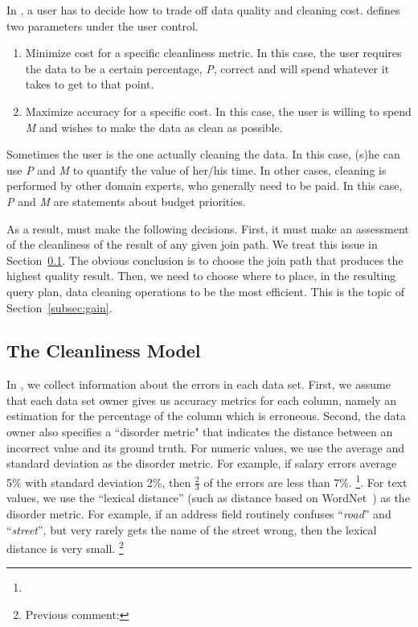 In \dcv, a user has to decide how to trade off data quality and cleaning cost. 
\dcv defines two parameters under the user control.

\begin{enumerate}
\item Minimize cost for a specific cleanliness metric. In this case, the user requires the data to be a certain percentage, \emph{P}, correct and will spend whatever it takes to get to that point.

\item Maximize accuracy for a specific cost. In this case, the user is willing to spend \emph{M} and wishes to make the data as clean as possible.
\end{enumerate}


Sometimes the user is the one actually cleaning the data. In this case, (s)he can use \emph{P} and \emph{M} to quantify the value of her/his time. 
In other cases, cleaning is performed by other domain experts, who generally need to be paid. In this case, \emph{P} and \emph{M} are statements about budget priorities.



As a result, \dcv must make the following decisions.  First, it must make an assessment of the cleanliness of the result of any given join path.  We treat this issue in Section~\ref{subsec:model}. The obvious conclusion is to choose the join path that produces the highest quality result.
Then, we need to choose where to place,  in the resulting query plan, data cleaning operations to be the most efficient.  This is the topic of Section~\ref{subsec:gain}.


\subsection{The Cleanliness Model}
\label{subsec:model}

In \dcv, we collect information about the errors in each data set. First, we assume that each data set owner gives us accuracy metrics for each column, namely an estimation for the percentage of the column which is erroneous. Second, the data owner also specifies a ``disorder metric" that indicates the distance between an incorrect value and its ground truth. For numeric values, we use the average and standard deviation as the disorder metric. For example, if salary errors average 5\% with standard deviation 2\%, then $\frac{2}{3}$ of the errors are less than 7\%. \footnote{}. For text values, we use the ``lexical distance'' (such as distance based on WordNet~\cite{WordNet,DBLP:journals/cacm/Miller95}) as the disorder metric. For example, if an address field routinely confuses ``\textit{road}'' and ``\textit{street}'', but very rarely gets the name of the street wrong, then the lexical distance is very small. \footnote{Previous comment: }


